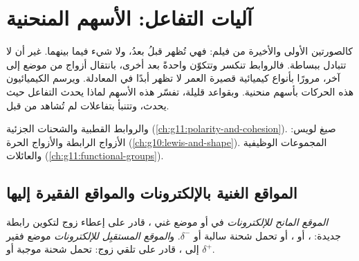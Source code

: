 \chapter{آليات التفاعل: الأسهم المنحنية}\label{ch:g12:curly-arrows}

 كالصورتين الأولى والأخيرة من فيلم: فهي
تُظهر  قبلُ  بعدُ، ولا شيء فيما
بينهما. غير أن  لا تتبادل  ببساطة. فالروابط تنكسر وتتكوّن واحدةً
بعد أخرى، بانتقال أزواج  من موضع إلى آخر، مرورًا بأنواع
كيميائية قصيرة العمر لا تظهر أبدًا في المعادلة. ويرسم الكيميائيون
هذه الحركات بأسهم منحنية. وبقواعد قليلة، تفسّر هذه الأسهم
لماذا يحدث التفاعل حيث يحدث، وتتنبأ بتفاعلات
لم تُشاهد من قبل.

\begin{recall}
 والروابط القطبية والشحنات الجزئية
(\cref{ch:g11:polarity-and-cohesion}). صيغ لويس: الأزواج الرابطة
والأزواج الحرة (\cref{ch:g10:lewis-and-shape}). المجموعات الوظيفية
والعائلات (\cref{ch:g11:functional-groups}).
\end{recall}

\section{المواقع الغنية بالإلكترونات والمواقع الفقيرة إليها}

\begin{definition}\label{def:g12:curly-arrows:site}
\emph{الموقع المانح للإلكترونات} في  أو
 موضع غني ، قادر على إعطاء زوج لتكوين رابطة
جديدة: ، أو ، أو  تحمل شحنة سالبة أو
 $\delta^-$. و\emph{الموقع المستقبِل
للإلكترونات} موضع فقير إلى ، قادر على
تلقي زوج:  تحمل شحنة موجبة أو 
$\delta^+$.
\end{definition}

